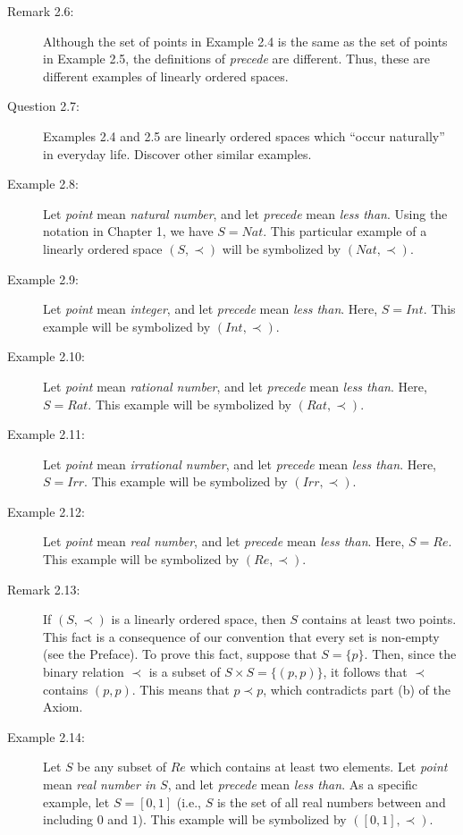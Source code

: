 \documentclass{book}
\begin{document}
\begin{description}
\item[Remark 2.6:] Although the set of points in Example 2.4 is the same as the set of points in Example 2.5, the definitions of \emph{precede} are different. Thus, these are different examples of linearly ordered spaces.

\item[Question 2.7:] Examples 2.4 and 2.5 are linearly ordered spaces which ``occur naturally'' in everyday life. Discover other similar examples.

\item[Example 2.8:] Let \emph{point} mean \emph{natural number}, and let \emph{precede} mean \emph{less than}. Using the notation in Chapter 1, we have $S = Nat$. This particular example of a linearly ordered space $(S, \prec)$ will be symbolized by $(Nat, \prec)$.

\item[Example 2.9:] Let \emph{point} mean \emph{integer}, and let \emph{precede} mean \emph{less than}. Here, $S = Int$. This example will be symbolized by $(Int, \prec)$.

\item[Example 2.10:] Let \emph{point} mean \emph{rational number}, and let \emph{precede} mean \emph{less than}. Here, $S = Rat$. This example will be symbolized by $(Rat, \prec)$.

\item[Example 2.11:] Let \emph{point} mean \emph{irrational number}, and let \emph{precede} mean \emph{less than}. Here, $S = Irr$. This example will be symbolized by $(Irr, \prec)$.

\item[Example 2.12:] Let \emph{point} mean \emph{real number}, and let \emph{precede} mean \emph{less than}. Here, $S = Re$. This example will be symbolized by $(Re, \prec)$.

\item[Remark 2.13:] If $(S, \prec)$ is a linearly ordered space, then $S$ contains at least two points. This fact is a consequence of our convention that every set is non-empty (see the Preface). To prove this fact, suppose that $S = \{ p \}$. Then, since the binary relation $\prec$ is a subset of $S \times S = \{ (p,p) \}$, it follows that $\prec$ contains $(p,p)$. This means that $p \prec p$, which contradicts part (b) of the Axiom.

\item[Example 2.14:] Let $S$ be any subset of $Re$ which contains at least two elements. Let \emph{point} mean \emph{real number in $S$}, and let \emph{precede} mean \emph{less than}. As a specific example, let $S = [0,1]$ (i.e., $S$ is the set of all real numbers between and including $0$ and $1$). This example will be symbolized by $([0,1], \prec)$.


\end{description}
\end{document}
